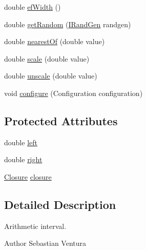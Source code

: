 \begin{DoxyCompactItemize}
\item 
double \hyperlink{classnet_1_1sf_1_1jclec_1_1util_1_1range_1_1_interval_a2cbf7cfb3266805b50bd2c4d594d311a}{ef\-Width} ()
\item 
double \hyperlink{classnet_1_1sf_1_1jclec_1_1util_1_1range_1_1_interval_aadbaa7399544bf2e40ad8d690314d737}{get\-Random} (\hyperlink{interfacenet_1_1sf_1_1jclec_1_1util_1_1random_1_1_i_rand_gen}{I\-Rand\-Gen} randgen)
\item 
double \hyperlink{classnet_1_1sf_1_1jclec_1_1util_1_1range_1_1_interval_af58056803c1cd8d2d6ff374e5554a72f}{nearest\-Of} (double value)
\item 
double \hyperlink{classnet_1_1sf_1_1jclec_1_1util_1_1range_1_1_interval_a061d4998b1c59da40a7fc707c9dfef5a}{scale} (double value)
\item 
double \hyperlink{classnet_1_1sf_1_1jclec_1_1util_1_1range_1_1_interval_a8075df146f02571b4540db5cc81c2f20}{unscale} (double value)
\item 
void \hyperlink{classnet_1_1sf_1_1jclec_1_1util_1_1range_1_1_interval_a68fe4a9f843e11a1869a6a791a215530}{configure} (Configuration configuration)
\end{DoxyCompactItemize}
\subsection*{Protected Attributes}
\begin{DoxyCompactItemize}
\item 
double \hyperlink{classnet_1_1sf_1_1jclec_1_1util_1_1range_1_1_interval_aa25ee9b30f56b5a932764b8091db7f52}{left}
\item 
double \hyperlink{classnet_1_1sf_1_1jclec_1_1util_1_1range_1_1_interval_ad657e25c0176501ea3bea8f25ece6bfc}{right}
\item 
\hyperlink{enumnet_1_1sf_1_1jclec_1_1util_1_1range_1_1_closure}{Closure} \hyperlink{classnet_1_1sf_1_1jclec_1_1util_1_1range_1_1_interval_a3233c1fbd6f1dc6d660f2e147d850bf6}{closure}
\end{DoxyCompactItemize}


\subsection{Detailed Description}
Arithmetic interval.

\begin{DoxyAuthor}{Author}
Sebastian Ventura 
\end{DoxyAuthor}


